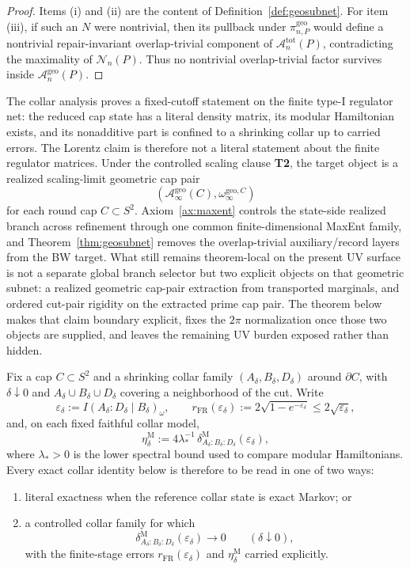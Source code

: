 \documentclass[11pt]{article}
\begin{document}
\begin{proof}
Items \textup{(i)} and \textup{(ii)} are the content of Definition~\ref{def:geosubnet}. For item \textup{(iii)}, if such an \(N\) were nontrivial, then its pullback under \(\pi_{n,P}^{\mathrm{geo}}\) would define a nontrivial repair-invariant overlap-trivial component of \(\mathcal A_n^{\mathrm{tot}}(P)\), contradicting the maximality of \(\mathcal N_n(P)\). Thus no nontrivial overlap-trivial factor survives inside \(\mathcal A_n^{\mathrm{geo}}(P)\).
\end{proof}

The collar analysis proves a fixed-cutoff statement on the finite type-I regulator net: the reduced cap state has a literal density matrix, its modular Hamiltonian exists, and its nonadditive part is confined to a shrinking collar up to carried errors. The Lorentz claim is therefore not a literal statement about the finite regulator matrices. Under the controlled scaling clause \textbf{T2}, the target object is a realized scaling-limit geometric cap pair
\[
(\mathcal A_\infty^{\mathrm{geo}}(C),\omega_\infty^{\mathrm{geo},C})
\]
for each round cap \(C\subset S^2\). Axiom~\ref{ax:maxent} controls the state-side realized branch across refinement through one common finite-dimensional MaxEnt family, and Theorem~\ref{thm:geosubnet} removes the overlap-trivial auxiliary/record layers from the BW target. What still remains theorem-local on the present UV surface is not a separate global branch selector but two explicit objects on that geometric subnet: a realized geometric cap-pair extraction from transported marginals, and ordered cut-pair rigidity on the extracted prime cap pair. The theorem below makes that claim boundary explicit, fixes the \(2\pi\) normalization once those two objects are supplied, and leaves the remaining UV burden exposed rather than hidden.

Fix a cap \(C\subset S^2\) and a shrinking collar family \((A_\delta,B_\delta,D_\delta)\) around \(\partial C\), with \(\delta\downarrow 0\) and \(A_\delta\cup B_\delta\cup D_\delta\) covering a neighborhood of the cut. Write
\[
\varepsilon_\delta:=I(A_\delta:D_\delta\mid B_\delta)_\omega,
\qquad
r_{\mathrm{FR}}(\varepsilon_\delta):=
2\sqrt{1-e^{-\varepsilon_\delta}}
\le 2\sqrt{\varepsilon_\delta},
\]
and, on each fixed faithful collar model,
\[
\eta_\delta^{\mathrm M}
:=
4\lambda_\ast^{-1}\,
\delta^{\mathrm M}_{A_\delta:B_\delta:D_\delta}(\varepsilon_\delta),
\]
where \(\lambda_\ast>0\) is the lower spectral bound used to compare modular Hamiltonians. Every exact collar identity below is therefore to be read in one of two ways:
\begin{enumerate}[leftmargin=2em]
\item literal exactness when the reference collar state is exact Markov; or
\item a controlled collar family for which
\[
\delta^{\mathrm M}_{A_\delta:B_\delta:D_\delta}(\varepsilon_\delta)\to 0
\qquad(\delta\downarrow 0),
\]
with the finite-stage errors \(r_{\mathrm{FR}}(\varepsilon_\delta)\) and \(\eta_\delta^{\mathrm M}\) carried explicitly.
\end{enumerate}
\end{document}
